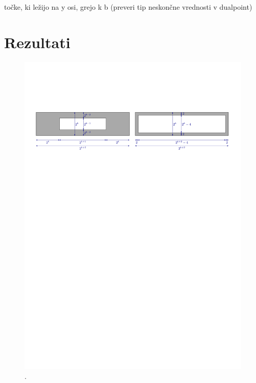 \documentclass[a4paper, 12pt]{book}
\begin{document}
točke, ki ležijo na y osi, grejo k b (preveri tip neskončne vrednosti v dualpoint)


\chapter{Rezultati}
\label{ch3}

\begin{figure}
\centerline{\includegraphics[scale=0.75, page=1]{pics/data_generation.pdf}}
\caption{. }
\label{generation}
\end{figure}
\end{document}
